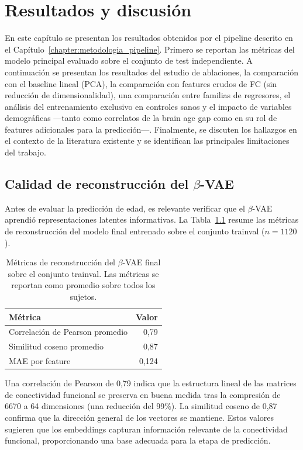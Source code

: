 \chapter{Resultados y discusión}
\label{chapter:resultados_discusion}

En este capítulo se presentan los resultados obtenidos por el pipeline descrito en el Capítulo~\ref{chapter:metodologia_pipeline}. Primero se reportan las métricas del modelo principal evaluado sobre el conjunto de test independiente. A continuación se presentan los resultados del estudio de ablaciones, la comparación con el baseline lineal (PCA), la comparación con features crudos de FC (sin reducción de dimensionalidad), una comparación entre familias de regresores, el análisis del entrenamiento exclusivo en controles sanos y el impacto de variables demográficas ---tanto como correlatos de la brain age gap como en su rol de features adicionales para la predicción---. Finalmente, se discuten los hallazgos en el contexto de la literatura existente y se identifican las principales limitaciones del trabajo.


\section{Calidad de reconstrucción del $\beta$-VAE}
\label{sec:res_vae}

Antes de evaluar la predicción de edad, es relevante verificar que el $\beta$-VAE aprendió representaciones latentes informativas. La Tabla~\ref{tab:vae_recon} resume las métricas de reconstrucción del modelo final entrenado sobre el conjunto trainval ($n = 1120$).

\begin{table}[H]
\centering
\caption{Métricas de reconstrucción del $\beta$-VAE final sobre el conjunto trainval. Las métricas se reportan como promedio sobre todos los sujetos.}
\label{tab:vae_recon}
\begin{tabular}{lr}
\toprule
\textbf{Métrica} & \textbf{Valor} \\
\midrule
Correlación de Pearson promedio & 0,79 \\
Similitud coseno promedio & 0,87 \\
MAE por feature & 0,124 \\
\bottomrule
\end{tabular}
\end{table}

Una correlación de Pearson de 0,79 indica que la estructura lineal de las matrices de conectividad funcional se preserva en buena medida tras la compresión de 6670 a 64 dimensiones (una reducción del 99\%). La similitud coseno de 0,87 confirma que la dirección general de los vectores se mantiene. Estos valores sugieren que los embeddings capturan información relevante de la conectividad funcional, proporcionando una base adecuada para la etapa de predicción.

